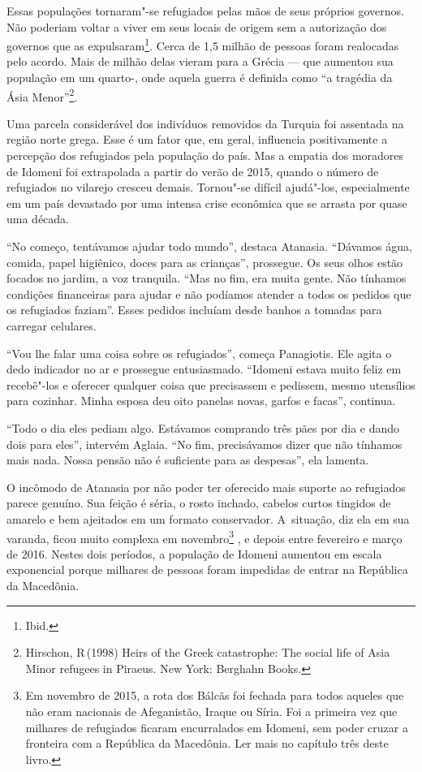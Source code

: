 Essas populações tornaram"-se refugiados pelas mãos de seus próprios
governos. Não poderiam voltar a viver em seus locais de origem sem a
autorização dos governos que as expulsaram\footnote{ Ibid.}. Cerca
de 1,5 milhão de pessoas foram realocadas pelo acordo. Mais de milhão
delas vieram para a Grécia --- que aumentou sua população em um quarto-,
onde aquela guerra é definida como ``a tragédia da Ásia
Menor''\footnote{ Hirschon, R\,(1998) Heirs of the Greek
catastrophe: The social life of Asia Minor refugees in Piraeus. New
York: Berghahn Books.}.

Uma parcela considerável dos indivíduos removidos da Turquia foi
assentada na região norte grega. Esse é um fator que, em geral,
influencia positivamente a percepção dos refugiados pela população do
país. Mas a empatia dos moradores de Idomeni foi extrapolada a partir do
verão de 2015, quando o número de refugiados no vilarejo cresceu
demais. Tornou"-se difícil ajudá"-los, especialmente em um país devastado
por uma intensa crise econômica que se arrasta por quase uma década.

``No começo, tentávamos ajudar todo mundo'', destaca Atanasia. ``Dávamos
água, comida, papel higiênico, doces para as crianças'', prossegue.
Os seus olhos estão focados no jardim, a voz tranquila. ``Mas no fim, era
muita gente. Não tínhamos condições financeiras para ajudar e não
podíamos atender a todos os pedidos que os refugiados faziam''.
Esses pedidos incluíam desde banhos a tomadas para carregar celulares.

``Vou lhe falar uma coisa sobre os refugiados'', começa Panagiotis. Ele
agita o dedo indicador no ar e prossegue entusiasmado. ``Idomeni estava
muito feliz em recebê"-los e oferecer qualquer coisa que precisassem e
pedissem, mesmo utensílios para cozinhar. Minha esposa deu
oito panelas novas, garfos e facas'', continua.

``Todo o dia eles pediam algo. Estávamos comprando três pães por dia e
dando dois para eles'', intervém Aglaia. ``No fim, precisávamos dizer
que não tínhamos mais nada. Nossa pensão não é suficiente para as
despesas'', ela lamenta.

O incômodo de Atanasia por não poder ter oferecido mais suporte ao
refugiados parece genuíno. Sua feição é séria, o rosto inchado, cabelos
curtos tingidos de amarelo e bem ajeitados em um formato conservador. A~situação,
diz ela em sua varanda, ficou muito complexa em
novembro\footnote{ Em novembro de 2015, a rota dos Bálcãs foi
fechada para todos aqueles que não eram nacionais de Afeganistão, Iraque
ou Síria. Foi a primeira vez que milhares de refugiados ficaram
encurralados em Idomeni, sem poder cruzar a fronteira com a República da
Macedônia. Ler mais no capítulo três deste livro.} , e depois entre fevereiro e março de
2016. Nestes dois períodos, a população de Idomeni aumentou em escala
exponencial porque milhares de pessoas foram impedidas de entrar na
República da Macedônia.
% 
% 
% 

